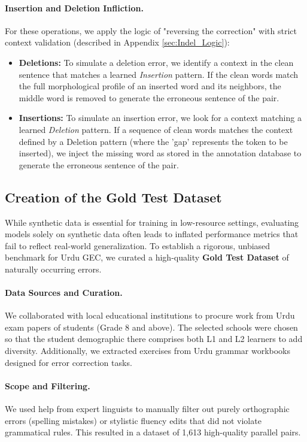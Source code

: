 \documentclass[11pt]{article}
\begin{document}
\paragraph{Insertion and Deletion Infliction.}
For these operations, we apply the logic of "reversing the correction" with strict context validation (described in Appendix \ref{sec:Indel_Logic}):
\begin{itemize}
\setlength{\itemsep}{0pt}
\setlength{\parskip}{0pt}
    \item \textbf{Deletions:} To simulate a deletion error, we identify a context in the clean sentence that matches a learned \textit{Insertion} pattern. If the clean words match the full morphological profile of an inserted word and its neighbors, the middle word is removed to generate the erroneous sentence of the pair.
    \item \textbf{Insertions:} To simulate an insertion error, we look for a context matching a learned \textit{Deletion} pattern. If a sequence of clean words matches the context defined by a Deletion pattern (where the 'gap' represents the token to be inserted), we inject the missing word as stored in the annotation database to generate the erroneous sentence of the pair.
\end{itemize}

\subsection{Creation of the Gold Test Dataset}
\label{sec:Gold_Dataset}

While synthetic data is essential for training in low-resource settings, evaluating models solely on synthetic data often leads to inflated performance metrics that fail to reflect real-world generalization. To establish a rigorous, unbiased benchmark for Urdu GEC, we curated a high-quality \textbf{Gold Test Dataset} of naturally occurring errors.

\paragraph{Data Sources and Curation.}
We collaborated with local educational institutions to procure work from Urdu exam papers of students (Grade 8 and above). The selected schools were chosen so that the student demographic there comprises both L1 and L2 learners to add diversity. Additionally, we extracted exercises from Urdu grammar workbooks designed for error correction tasks.

\paragraph{Scope and Filtering.}
We used help from expert linguists to manually filter out purely orthographic errors (spelling mistakes) or stylistic fluency edits that did not violate grammatical rules. This resulted in a dataset of 1,613 high-quality parallel pairs.
\end{document}
